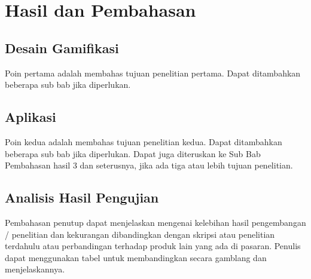 \chapter{Hasil dan Pembahasan}

\section{Desain Gamifikasi}

Poin pertama adalah membahas tujuan penelitian pertama. 
Dapat ditambahkan beberapa sub bab jika diperlukan.

\section{Aplikasi}

Poin kedua adalah membahas tujuan penelitian kedua. Dapat ditambahkan beberapa 
sub bab jika diperlukan. Dapat juga diteruskan ke Sub Bab Pembahasan hasil 3 dan 
seterusnya, jika ada tiga atau lebih tujuan penelitian.

\section{Analisis Hasil Pengujian}

Pembahasan penutup dapat menjelaskan mengenai kelebihan hasil pengembangan / 
penelitian dan kekurangan dibandingkan dengan skripsi atau penelitian terdahulu atau
perbandingan terhadap produk lain yang ada di pasaran. Penulis dapat menggunakan tabel untuk membandingkan secara gamblang dan menjelaskannya.